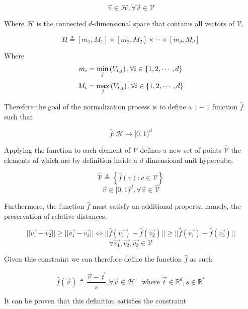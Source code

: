 \documentclass{juliacon}
\begin{document}
$$ \vec{v} \in \mathcal{H}, \forall \vec{v} \in \mathcal{V}$$

Where $\mathcal{H}$ is the connected $d$-dimensional space that contains all vectors
of $\mathcal{V}$.

$$ H \triangleq [m_1, M_1] \times [m_2, M_2] \times \cdots \times [m_d, M_d] $$

Where
$$\space m_i = \min_j\left(V_{i,j}\right), \forall i \in \left\{1, 2, \cdots, d\right\}$$
$$\space M_i = \max_j\left(V_{i,j}\right), \forall i \in \left\{1, 2, \cdots, d\right\}$$

Therefore the goal of the normalization process is to define a $1-1$ function $\hat{f}$
such that

$$\hat{f}: \mathcal{H} \rightarrow [0, 1)^d$$

Applying the function to each element of $\mathcal{V}$ defines a new set of points
$\hat{\mathcal{V}}$ the elements of which are by definition inside a $d$-dimensional unit
hypercube.

$$ \hat{\mathcal{V}} \triangleq \left\{ \hat{f}\left(v\right) : v \in \mathcal{V} \right\}  $$
$$ \vec{v} \in [0, 1)^d, \forall \vec{v} \in \hat{\mathcal{V}} $$

Furthermore, the function $\hat{f}$ must satisfy an additional property, namely,
the preservation of relative distances.

$$ ||\vec{v_1} - \vec{v_2}|| \geq ||\vec{v_1} - \vec{v_3}|| \Leftrightarrow ||\hat{f}(\vec{v_1}) - \hat{f}(\vec{v_2})|| \geq ||\hat{f}(\vec{v_1}) - \hat{f}(\vec{v_3})||$$
$$ \forall \vec{v_1}, \vec{v_2}, \vec{v_3} \in \mathcal{V} $$

Given this constraint we can therefore define the function $\hat{f}$ as such
\begin{definition}
  $$\hat{f}(\vec{v}) \triangleq \frac{\vec{v} - \vec{t}}{s}, \forall \vec{v} \in \mathcal{H} \quad \textrm{where}\; \vec{t} \in \mathbb{R}^d, s\in\mathbb{R}^*$$
\end{definition}

It can be proven that this definition satisfies the constraint
\end{document}
